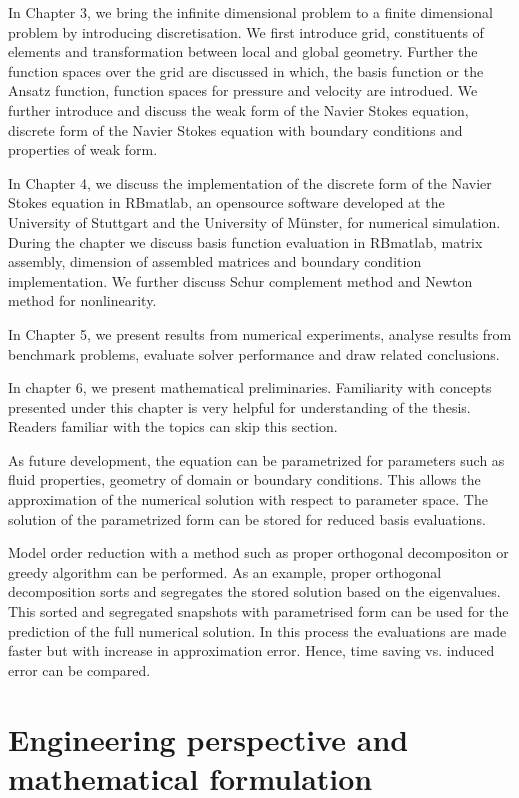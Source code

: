 \documentclass[a4paper]{book}
\begin{document}
In Chapter 3, we bring the infinite dimensional problem to a finite dimensional problem by introducing discretisation. We first introduce grid, constituents of elements and transformation between local and global geometry. Further the function spaces over the grid are discussed in which, the basis function or the Ansatz function, function spaces for pressure and velocity are introdued. We further introduce and discuss the weak form of the Navier Stokes equation, discrete form of the Navier Stokes equation with boundary conditions and properties of weak form.

In Chapter 4, we discuss the implementation of the discrete form of the Navier Stokes equation in RBmatlab, an opensource software developed at the University of Stuttgart and the University of M\"unster, for numerical simulation. During the chapter we discuss basis function evaluation in RBmatlab, matrix assembly, dimension of assembled matrices and boundary condition implementation. We further discuss Schur complement method and Newton method for nonlinearity.

In Chapter 5, we present results from numerical experiments, analyse results from benchmark problems, evaluate solver performance and draw related conclusions.

In chapter 6, we present mathematical preliminaries. Familiarity with concepts presented under this chapter is very helpful for understanding of the thesis. Readers familiar with the topics can skip this section.

As future development, the equation can be parametrized for parameters such as fluid properties, geometry of domain or boundary conditions. This allows the approximation of the numerical solution with respect to parameter space. The solution of the parametrized form can be stored for reduced basis evaluations.

Model order reduction with a method such as proper orthogonal decompositon or greedy algorithm can be performed. As an example, proper orthogonal decomposition sorts and segregates the stored solution based on the eigenvalues. This sorted and segregated snapshots with parametrised form can be used for the prediction of the full numerical solution. In this process the evaluations are made faster but with increase in approximation error. Hence, time saving vs. induced error can be compared.

\newpage

\chapter[Perspective and Formulation]{Engineering perspective and mathematical formulation} 
\end{document}
